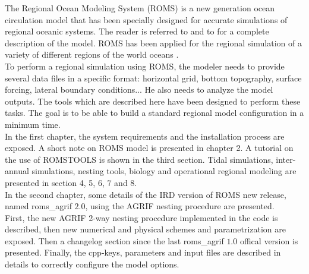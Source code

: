 

The Regional Ocean Modeling System (ROMS) is a new generation ocean circulation model
\citep{Shc03b} that has been specially designed for accurate simulations of regional
oceanic systems.  The reader is referred to \citet{Shc03a} and to \citet{Shc03b} for
a complete description of the model.  ROMS has been applied for the regional
simulation of a variety of different regions of the world oceans
\citep[e.g.][]{Bla02,Dil03,Hai00,Mac02,Mar03,Pen01}. \\

To perform a regional simulation using ROMS, the modeler needs to provide several
data files in a specific format: horizontal grid, bottom topography, surface forcing,
lateral boundary conditions... He also needs to analyze the model outputs. The tools
which are described here have been designed to perform these tasks.  The goal is to
be able to build a standard regional model configuration in a minimum time. \\

In the first chapter, the system requirements and the installation process are
exposed. A short note on ROMS model is presented in chapter 2. A tutorial on the use
of ROMSTOOLS is shown in the third section. Tidal simulations, inter-annual
simulations, nesting tools, biology and operational regional modeling are presented
in section 4,
5, 6, 7 and 8. \\

In the second chapter, some details of the IRD version of ROMS new release, named
roms\_agrif $2.0$, using the AGRIF nesting procedure are presented. \\
First, the new AGRIF 2-way nesting procedure implemented in the code is described,
then new numerical and physical schemes and parametrization are exposed. Then a
changelog section since the last roms\_agrif $1.0$ offical version is presented.
Finally, the cpp-keys, parameters and input files are described in details to
correctly configure the model options.

